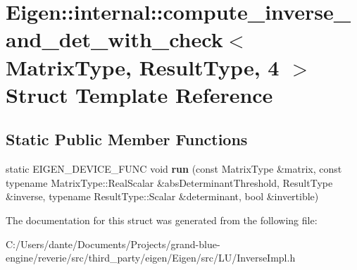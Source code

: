 \hypertarget{struct_eigen_1_1internal_1_1compute__inverse__and__det__with__check_3_01_matrix_type_00_01_result_type_00_014_01_4}{}\section{Eigen\+::internal\+::compute\+\_\+inverse\+\_\+and\+\_\+det\+\_\+with\+\_\+check$<$ Matrix\+Type, Result\+Type, 4 $>$ Struct Template Reference}
\label{struct_eigen_1_1internal_1_1compute__inverse__and__det__with__check_3_01_matrix_type_00_01_result_type_00_014_01_4}
\subsection*{Static Public Member Functions}
\begin{DoxyCompactItemize}
\item 
\mbox{\label{struct_eigen_1_1internal_1_1compute__inverse__and__det__with__check_3_01_matrix_type_00_01_result_type_00_014_01_4_abe35a5b8a514af880fd4cdd8186b1918}} 
static E\+I\+G\+E\+N\+\_\+\+D\+E\+V\+I\+C\+E\+\_\+\+F\+U\+NC void {\bfseries run} (const Matrix\+Type \&matrix, const typename Matrix\+Type\+::\+Real\+Scalar \&abs\+Determinant\+Threshold, Result\+Type \&inverse, typename Result\+Type\+::\+Scalar \&determinant, bool \&invertible)
\end{DoxyCompactItemize}


The documentation for this struct was generated from the following file\+:\begin{DoxyCompactItemize}
\item 
C\+:/\+Users/dante/\+Documents/\+Projects/grand-\/blue-\/engine/reverie/src/third\+\_\+party/eigen/\+Eigen/src/\+L\+U/Inverse\+Impl.\+h\end{DoxyCompactItemize}
